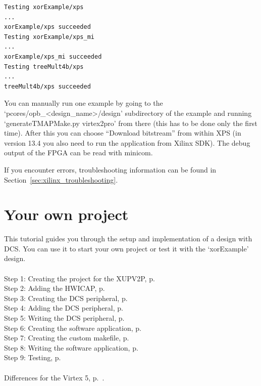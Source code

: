 \documentclass[a4paper,oneside]{memoir}
\begin{document}
\begin{lstlisting}
Testing xorExample/xps
...
xorExample/xps succeeded
Testing xorExample/xps_mi
...
xorExample/xps_mi succeeded
Testing treeMult4b/xps
...
treeMult4b/xps succeeded
\end{lstlisting}

You can manually run one example by going to the `pcores/opb\_<design\_name>/design' subdirectory of the example and running `generateTMAPMake.py virtex2pro' from there (this has to be done only the first time). After this you can choose ``Download bitstream'' from within XPS (in version 13.4 you also need to run the application from Xilinx SDK).
The debug output of the FPGA can be read with minicom.

If you encounter errors, troubleshooting information can be found in Section~\ref{sec:xilinx_troubleshooting}.

\section{Your own project}
This tutorial guides you through the setup and implementation of a design with DCS. You can use it to start your own project or test it with the `xorExample' design.\\
\\
Step 1: Creating the project for the XUPV2P, p.\ \pageref{sec:creating_proj}\\
Step 2: Adding the HWICAP, p.\ \pageref{sec:adding_hwicap}\\
Step 3: Creating the DCS peripheral, p.\ \pageref{sec:creating_peripheral}\\
Step 4: Adding the DCS peripheral, p.\ \pageref{sec:adding_peripheral}\\
Step 5: Writing the DCS peripheral, p.\ \pageref{sec:writing_peripheral}\\
Step 6: Creating the software application, p.\ \pageref{sec:creating_software}\\
Step 7: Creating the custom makefile, p.\ \pageref{sec:creating_makefile}\\
Step 8: Writing the software application, p.\ \pageref{sec:writing_software}\\
Step 9: Testing, p.\ \pageref{sec:testing}\\
\\
Differences for the Virtex 5, p.\ \pageref{sec:diff_virtex5}.
\end{document}
